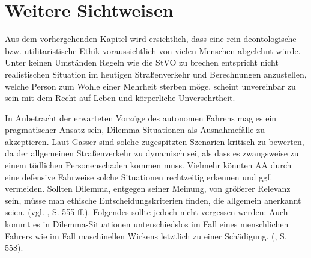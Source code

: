 \documentclass[a4paper, 12pt, titlepage]{scrartcl}
\begin{document}
\section{Weitere Sichtweisen}
	Aus dem vorhergehenden Kapitel wird ersichtlich, dass eine rein deontologische bzw. utilitaristische Ethik voraussichtlich von vielen Menschen abgelehnt w\"urde. Unter keinen Umst\"anden Regeln wie die StVO zu brechen entspricht nicht realistischen Situation im heutigen Stra\ss enverkehr und Berechnungen anzustellen, welche Person zum Wohle einer Mehrheit sterben m\"oge, scheint unvereinbar zu sein mit dem Recht auf Leben und k\"orperliche Unversehrtheit. 
	
	In Anbetracht der erwarteten Vorz\"uge des autonomen Fahrens mag es ein pragmatischer Ansatz sein, Dilemma-Situationen als Ausnahmef\"alle zu akzeptieren. Laut Gasser \autocite{Gasser2015} sind solche zugespitzten Szenarien kritisch zu bewerten, da der allgemeinen Stra\ss enverkehr zu dynamisch sei, als dass es zwangsweise zu einem t\"odlichen Personenschaden kommen muss. Vielmehr k\"onnten AA durch eine defensive Fahrweise solche Situationen rechtzeitig erkennen und ggf. vermeiden. Sollten Dilemma, entgegen seiner Meinung, von gr\"o\ss erer Relevanz sein, m\"usse man ethische Entscheidungskriterien finden, die allgemein anerkannt seien. (vgl. \autocite{Gasser2015}, S. 555 ff.). Folgendes sollte jedoch nicht vergessen werden: \glqq Auch kommt es in \glq Dilemma-Situationen\grq{} unterschiedslos im Fall eines menschlichen Fahrers wie im Fall maschinellen Wirkens letztlich zu einer Schädigung.\grqq{} (\autocite{Gasser2015}, S. 558). 
	
\end{document}
